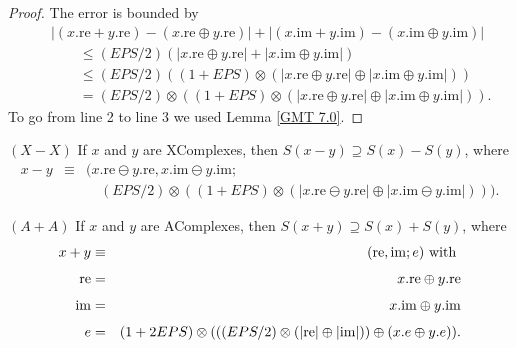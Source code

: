 \begin{proof}{}
The error is bounded by
\begin{eqnarray*}
&&|(x.\mathrm {re} + y.\mathrm {re}) - (x.\mathrm {re} \oplus y.\mathrm {re})| + 
  |(x.\mathrm {im} + y.\mathrm {im}) - (x.\mathrm {im} \oplus y.\mathrm {im})|\\[4pt]
&&\qquad \le (EPS/2)(| x.\mathrm {re} \oplus y.\mathrm {re}| + 
   |x.\mathrm {im} \oplus y.\mathrm {im}|)\\[4pt]
&&\qquad \le (EPS/2)((1 + EPS) \otimes (| x.\mathrm {re} \oplus y.\mathrm {re}| \oplus 
   |x.\mathrm {im} \oplus y.\mathrm {im}|))\\[4pt]
&&\qquad = (EPS/2) \otimes ((1 + EPS) \otimes (| x.\mathrm {re} \oplus y.\mathrm {re}| \oplus 
   |x.\mathrm {im} \oplus y.\mathrm {im}|)).
\end{eqnarray*}
To go from line 2 to line 3 we used Lemma \ref{GMT 7.0}. \end{proof}

\begin{proposition}\label{GMT prop7.5}{$(X - X)$}
If $x$ and $y$ are {\textrm XComplexes,} then 
$S(x - y) \supseteq S(x) - S(y)${\textrm ,} where
\begin{eqnarray*}
x - y &\equiv& (x.\mathrm {re} \ominus y.\mathrm {re}, x.\mathrm {im} \ominus y.\mathrm {im};\\[4pt]
&&\quad 
(EPS/2)\otimes ((1 + EPS) \otimes (|x.\mathrm {re} \ominus y.\mathrm {re}| \oplus |x.\mathrm {im} \ominus y.\mathrm {im}|))).
\end{eqnarray*} \end{proposition}


\begin{proposition}\label{GMT prop7.6}{$(A + A)$} 
If $x$ and $y$ are {\textrm AComplexes,} then 
$S(x + y) \supseteq S(x) + S(y)${\textrm ,} where
\begin{eqnarray*}
 x+y &\equiv& (\mathrm {re},\mathrm {im};e) \hbox{ with }\\[4pt]
\mathrm {re}& =& x.\mathrm {re} \oplus y.\mathrm {re}\\[4pt]
\mathrm {im}& =& x.\mathrm {im} \oplus y.\mathrm {im}\\[4pt]
e& =& (1 + 2 EPS) \otimes ( ((EPS/2) \otimes (|\mathrm {re}| \oplus |\mathrm {im}|))
 \oplus (x.e \oplus y.e)). \end{eqnarray*}
\end{proposition}

